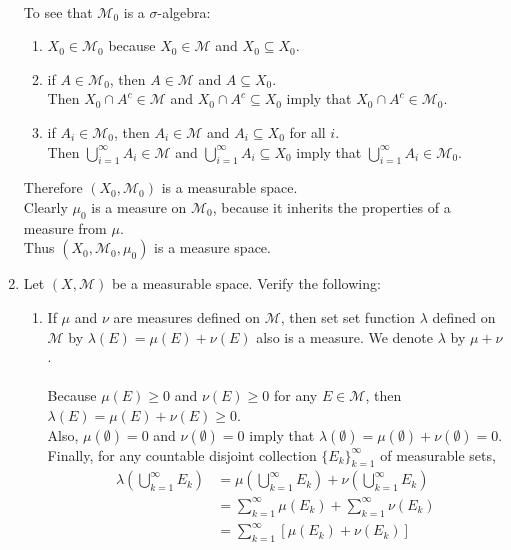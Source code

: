 \begin{enumerate}
	\\To see that $\mathcal{M}_0$ is a $\sigma$-algebra:
	\begin{enumerate}[label=(\roman*),align=left]   
		\item $X_0\in\mathcal{M}_0$ because $X_0\in\mathcal{M}$ and $X_0\subseteq X_0$.
		\item if $A\in\mathcal{M}_0$, then $A\in\mathcal{M}$ and $A\subseteq X_0$.\\
		Then $X_0\cap A^c\in\mathcal{M}$ and $X_0\cap A^c\subseteq X_0$ imply that $X_0\cap A^c\in\mathcal{M}_0$.
		\item if $A_i\in\mathcal{M}_0$, then $A_i\in\mathcal{M}$ and $A_i\subseteq X_0$ for all $i$.\\
		Then $\bigcup_{i=1}^\infty A_i\in\mathcal{M}$ and $\bigcup_{i=1}^\infty A_i\subseteq X_0$ imply that $\bigcup_{i=1}^\infty A_i\in\mathcal{M}_0$.
	\end{enumerate}
	Therefore $(X_0,\mathcal{M}_0)$ is a measurable space.\\
	Clearly $\mu_0$ is a measure on $\mathcal{M}_0$, because it inherits the properties of a measure from $\mu$.\\
	Thus $(X_0,\mathcal{M}_0,\mu_0)$ is a measure space.
	\item Let $(X,\mathcal{M})$ be a measurable space. Verify the following:
	\begin{enumerate}[label=(\roman*),align=left]  
		\item If $\mu$ and $\nu$ are measures defined on $\mathcal{M}$, then set set function $\lambda$ defined on $\mathcal{M}$ by $\lambda(E)=\mu(E)+\nu(E)$ also is a measure. We denote $\lambda$ by $\mu+\nu$.\\
		\\Because $\mu(E)\ge 0$ and $\nu(E)\ge 0$ for any $E\in\mathcal{M}$, then $\lambda(E)=\mu(E)+\nu(E)\ge 0$.
		\\Also, $\mu(\emptyset)= 0$ and $\nu(\emptyset)= 0$ imply that $\lambda(\emptyset)=\mu(\emptyset)+\nu(\emptyset)= 0$.
		\\Finally, for any countable disjoint collection $\{E_k\}_{k=1}^\infty$ of measurable sets,
		\begin{align*}
			\lambda\left(\bigcup_{k=1}^\infty E_k\right)&=\mu\left(\bigcup_{k=1}^\infty E_k\right)+\nu\left(\bigcup_{k=1}^\infty E_k\right)\\
			&=\sum_{k=1}^\infty\mu(E_k)+\sum_{k=1}^\infty\nu(E_k)\\
			&=\sum_{k=1}^\infty[\mu(E_k)+\nu(E_k)]\\

\end{align*}
\end{enumerate}
\end{enumerate}
